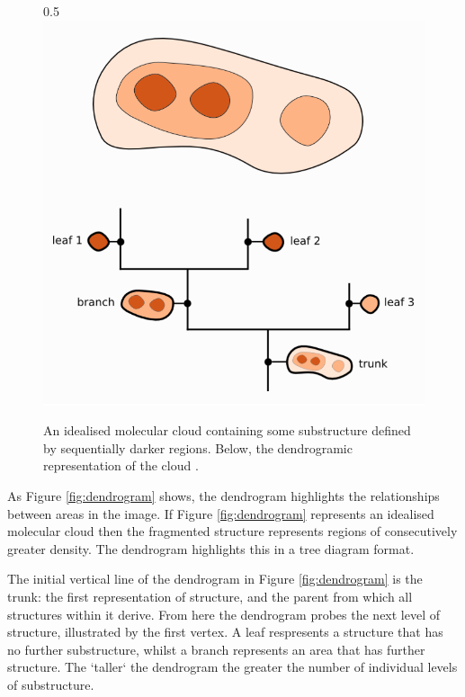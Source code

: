 \documentclass{report}
\begin{document}
\begin{figure}[h]{0.5\textwidth}
  \centering
  \includegraphics[scale=0.5]{../img/dendrogram}
  \caption[An idealised molecular cloud containing some substructure defined by sequentially darker regions. Below, the dendrogramic representation of the cloud \parencite{dendrogramimg}.]{An idealised molecular cloud containing some substructure defined by sequentially darker regions. Below, the dendrogramic representation of the cloud \parencite{dendrogramimg}.}
\end{figure}\label{fig:dendrogram}

As Figure \ref{fig:dendrogram} shows, the dendrogram highlights the relationships between areas in the image. If Figure \ref{fig:dendrogram} represents an idealised molecular cloud then the fragmented structure represents regions of consecutively greater density. The dendrogram highlights this in a tree diagram format.

The initial vertical line of the dendrogram in Figure \ref{fig:dendrogram} is the trunk: the first representation of structure, and the parent from which all structures within it derive. From here the dendrogram probes the next level of structure, illustrated by the first vertex. A leaf respresents a structure that has no further substructure, whilst a branch represents an area that has further structure. The `taller` the dendrogram the greater the number of individual levels of substructure.
\end{document}
